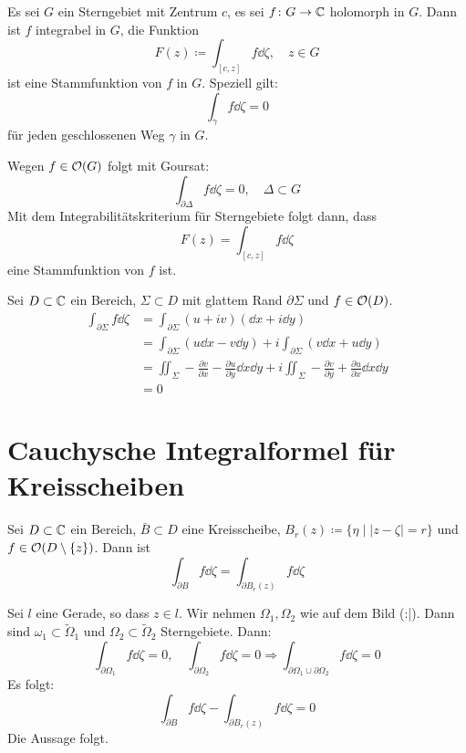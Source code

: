 \begin{satz}
Es sei $ G $ ein Sterngebiet mit Zentrum $ c $, es sei $ f\colon G\rightarrow\mathbb{C} $ holomorph in $ G $. Dann ist $ f $ integrabel in $ G $, die Funktion
\[ F(z)\coloneqq\int_{[c,z]}^{} f\dd\zeta,\quad z\in G \]
ist eine Stammfunktion von $ f $ in $ G $. Speziell gilt:
\[ \int_{\gamma}^{} f\dd\zeta=0 \]
f\"ur jeden geschlossenen Weg $ \gamma $ in $ G $.
\end{satz}
\begin{beweis}
Wegen $ f\in\mathcal O(G) $ folgt mit Goursat:
\[ \int_{\partial\Delta}^{} f\dd\zeta=0,\quad\Delta\subset G \]
Mit dem Integrabilit\"atskriterium f\"ur Sterngebiete folgt dann, dass
\[ F(z)=\int_{[c,z]}^{} f\dd\zeta \] eine Stammfunktion von $ f $ ist.
\end{beweis}
\begin{beweis}
Sei $ D\subset\mathbb{C} $ ein Bereich, $ \Sigma\subset D $ mit glattem Rand $ \partial\Sigma $ und $ f\in\mathcal O(D) $.
\begin{align*} \int_{\partial\Sigma} f\dd\zeta&=\int_{\partial\Sigma}^{} (u+iv)(\dd x+i\dd y)\\&=\int_{\partial\Sigma}(u\dd x-v\dd y)+i\int_{\partial\Sigma}^{} (v\dd x+u\dd y)\\&=\iint_\Sigma -\frac{\partial v}{\partial x}-\frac{\partial u}{\partial y}\dd x\dd y+i\iint_\Sigma-\frac{\partial v}{\partial y}+\frac{\partial u}{\partial x}\dd x\dd y\\&=0 \end{align*}
\end{beweis}
\newpage
\section{Cauchysche Integralformel f\"ur Kreisscheiben}
\begin{lemma}[Zentrierungslemma]
Sei $ D\subset\mathbb{C} $ ein Bereich, $ \bar B\subset D $ eine Kreisscheibe, $ B_r(z)\coloneqq\lbrace\eta\mid |z-\zeta|=r\rbrace $ und $ f\in\mathcal O(D\setminus\lbrace z\rbrace) $. Dann ist
\[ \int_{\partial B}^{} f\dd\zeta=\int_{\partial B_r(z)}^{} f\dd\zeta \]
\end{lemma}
\begin{beweis}
Sei $ l $ eine Gerade, so dass $ z\in l $. Wir nehmen $ \Omega_1,\Omega_2 $ wie auf dem Bild (:|). Dann sind $\omega_1\subset\tilde \Omega_1 $ und $ \Omega_2\subset\tilde{\Omega}_2 $ Sterngebiete.
Dann:
\[ \int_{\partial\Omega_1}^{} f\dd\zeta=0,\quad\int_{\partial\Omega_2}^{} f\dd\zeta = 0\Rightarrow\int_{\partial\Omega_1\cup\partial\Omega_2}^{} f\dd\zeta = 0 \]
Es folgt:
\[ \int_{\partial B}^{} f\dd\zeta - \int_{\partial B_r(z)}^{} f\dd\zeta = 0 \]
Die Aussage folgt.
\end{beweis}